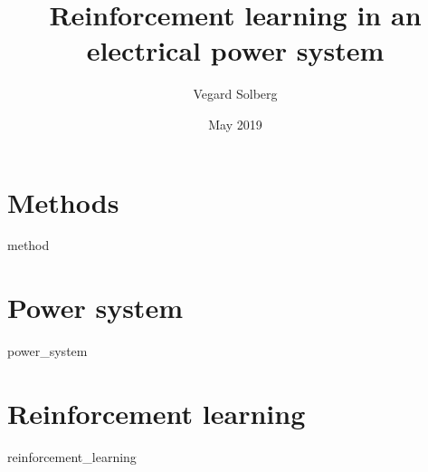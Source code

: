 \documentclass{book}
\title{Reinforcement learning in an electrical power system}
\author{Vegard Solberg}
\date{May 2019}
\begin{document}
 
    \maketitle
    \tableofcontents
    
    \chapter{Methods}
    {method}

    
 
    \chapter{Power system}
    {power_system}
 
    \chapter{Reinforcement learning}
    {reinforcement_learning}
    
    \printbibliography
 
\end{document}
